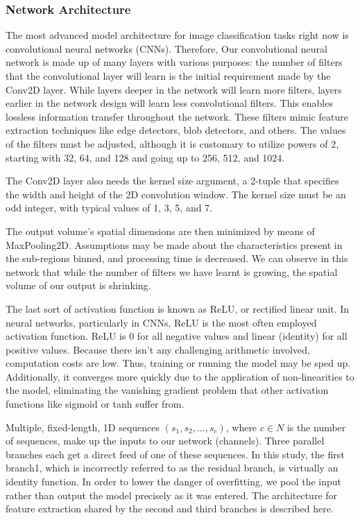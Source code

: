 \documentclass[letterpaper, 10 pt, conference]{ieeeconf}  %
\begin{document}
\subsubsection*{\bf Network Architecture}
The most advanced model architecture for image classification tasks right now is convolutional neural networks (CNNs). Therefore, Our convolutional neural network is made up of many layers with various purposes: the number of filters that the convolutional layer will learn is the initial requirement made by the Conv2D layer. While layers deeper in the network will learn more filters, layers earlier in the network design will learn less convolutional filters. This enables lossless information transfer throughout the network. These filters mimic feature extraction techniques like edge detectors, blob detectors, and others. The values of the filters must be adjusted, although it is customary to utilize powers of 2, starting with 32, 64, and 128 and going up to 256, 512, and 1024. \par

The Conv2D layer also needs the kernel size argument, a 2-tuple that specifies the width and height of the 2D convolution window. The kernel size must be an odd integer, with typical values of 1, 3, 5, and 7. \par

The output volume's spatial dimensions are then minimized by means of MaxPooling2D. Assumptions may be made about the characteristics present in the sub-regions binned, and processing time is decreased. We can observe in this network that while the number of filters we have learnt is growing, the spatial volume of our output is shrinking. \par

The last sort of activation function is known as ReLU, or rectified linear unit. In neural networks, particularly in CNNs, ReLU is the most often employed activation function. ReLU is 0 for all negative values and linear (identity) for all positive values. Because there isn't any challenging arithmetic involved, computation costs are low. Thus, training or running the model may be sped up. Additionally, it converges more quickly due to the application of non-linearities to the model, eliminating the vanishing gradient problem that other activation functions like sigmoid or tanh suffer from. \par

Multiple, fixed-length, 1D sequences $(s_1, s_2,..., s_c)$, where $c \in N$ is the number of sequences, make up the inputs to our network (channels). Three parallel branches each get a direct feed of one of these sequences. In this study, the first branch1, which is incorrectly referred to as the residual branch, is virtually an identity function. In order to lower the danger of overfitting, we pool the input rather than output the model precisely as it was entered. The architecture for feature extraction shared by the second and third branches is described here. \par
\end{document}
